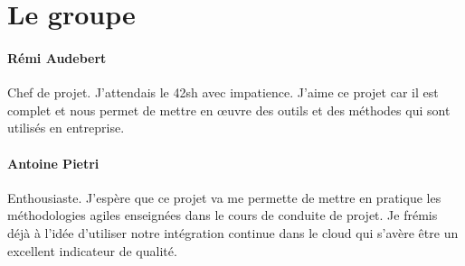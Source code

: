 \section{Le groupe}

\paragraph{Rémi Audebert} Chef de projet. J'attendais le 42sh avec impatience.
J'aime ce projet car il est complet et nous permet de mettre en œuvre des
outils et des méthodes qui sont utilisés en entreprise.

\paragraph{Antoine Pietri} Enthousiaste. J'espère que ce projet va me permette
de mettre en pratique les méthodologies agiles enseignées dans le cours de
conduite de projet. Je frémis déjà à l'idée d'utiliser notre intégration
continue dans le cloud qui s'avère être un excellent indicateur de qualité.
